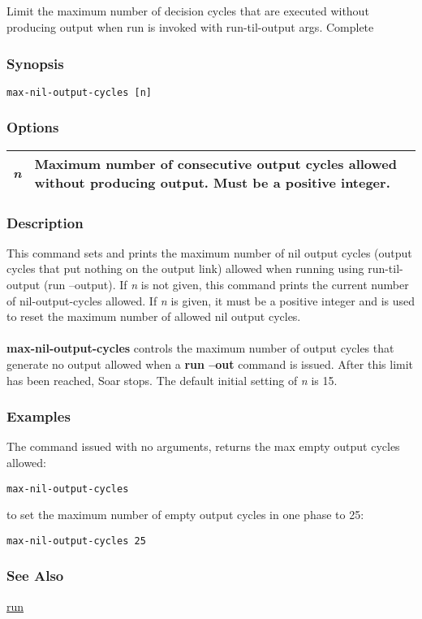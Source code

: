 \subsection{}
\label{max-nil-output-cycles}
Limit the maximum number of decision cycles that are executed without producing output when run is invoked with run-til-output args. 
 Complete
\subsubsection*{Synopsis}
\begin{verbatim}
max-nil-output-cycles [n]
\end{verbatim}
\subsubsection*{Options}
\begin{tabular}{|l|l|}
\hline 
\emph{n}
 & Maximum number of consecutive output cycles allowed without producing output. Must be a positive integer.  \\
 \hline 
\end{tabular}
\subsubsection*{Description}
 This command sets and prints the maximum number of nil output cycles (output cycles that put nothing on the output link) allowed when running using run-til-output (run --output). If \emph{n}
 is not given, this command prints the current number of nil-output-cycles allowed. If \emph{n}
 is given, it must be a positive integer and is used to reset the maximum number of allowed nil output cycles. \\ 
\\ 
\textbf{max-nil-output-cycles}
 controls the maximum number of output cycles that generate no output allowed when a \textbf{run --out}
 command is issued. After this limit has been reached, Soar stops. The default initial setting of \emph{n}
 is 15. 
\subsubsection*{Examples}
 The command issued with no arguments, returns the max empty output cycles allowed: \begin{verbatim}
max-nil-output-cycles 
\end{verbatim}
 to set the maximum number of empty output cycles in one phase to 25: \begin{verbatim}
max-nil-output-cycles 25 
\end{verbatim}
\subsubsection*{See Also}
\hyperref[run]{run} 